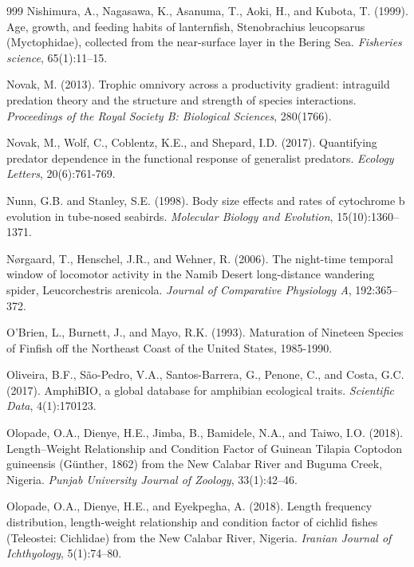 \begin{thebibliography}{999}
Nishimura, A., Nagasawa, K., Asanuma, T., Aoki, H., and Kubota, T. (1999). Age, growth, and feeding habits of lanternfish, Stenobrachius leucopsarus (Myctophidae), collected from the near-surface layer in the Bering Sea. \textit{Fisheries science}, 65(1):11--15.

Novak, M. (2013). Trophic omnivory across a productivity gradient: intraguild predation theory and the structure and strength of species interactions. \textit{Proceedings of the Royal Society B: Biological Sciences}, 280(1766).

Novak, M., Wolf, C., Coblentz, K.E., and Shepard, I.D. (2017). Quantifying predator dependence in the functional response of generalist predators. \textit{Ecology Letters}, 20(6):761-769.

Nunn, G.B. and Stanley, S.E. (1998). Body size effects and rates of cytochrome b evolution in tube-nosed seabirds. \textit{Molecular Biology and Evolution}, 15(10):1360--1371.

N{\o}rgaard, T., Henschel, J.R., and Wehner, R. (2006). The night-time temporal window of locomotor activity in the Namib Desert long-distance wandering spider, Leucorchestris arenicola. \textit{Journal of Comparative Physiology A}, 192:365--372.

O'Brien, L., Burnett, J., and Mayo, R.K. (1993). Maturation of Nineteen Species of Finfish off the Northeast Coast of the United States, 1985-1990.

Oliveira, B.F., S{\~a}o-Pedro, V.A., Santos-Barrera, G., Penone, C., and Costa, G.C. (2017). Amphi{BIO}, a global database for amphibian ecological traits. \textit{Scientific Data}, 4(1):170123.

Olopade, O.A., Dienye, H.E., Jimba, B., Bamidele, N.A., and Taiwo, I.O. (2018). Length--Weight Relationship and Condition Factor of Guinean Tilapia Coptodon guineensis (G{\"u}nther, 1862) from the New Calabar River and Buguma Creek, Nigeria. \textit{Punjab University Journal of Zoology}, 33(1):42--46.

Olopade, O.A., Dienye, H.E., and Eyekpegha, A. (2018). Length frequency distribution, length-weight relationship and condition factor of cichlid fishes (Teleostei: Cichlidae) from the New Calabar River, Nigeria. \textit{Iranian Journal of Ichthyology}, 5(1):74--80.


\end{thebibliography}
